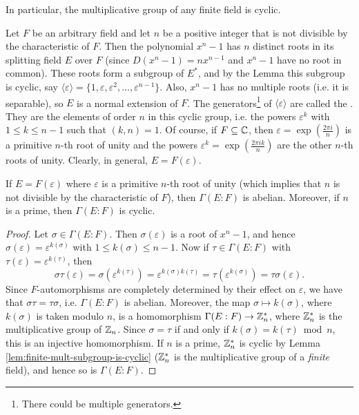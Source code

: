 In particular, the multiplicative group of any finite field is cyclic.

Let $F$ be an arbitrary field and let $n$ be a positive integer that is not divisible by the characteristic of $F$. Then the polynomial $x^n - 1$ has $n$ distinct roots in its splitting field $E$ over $F$ (since $D(x^n - 1) = nx^{n - 1}$ and $x^n - 1$ have no root in common). These roots form a subgroup of $E^*$, and by the Lemma this subgroup is cyclic, say $\langle \varepsilon \rangle = \{1, \varepsilon, \varepsilon^2, \dots, \varepsilon^{n - 1}\}$. Also, $x^n - 1$ has no multiple roots (i.e. it is separable), so $E$ is a normal extension of $F$. The generators\footnote{There could be multiple generators.} of $\langle \varepsilon \rangle$ are called the . They are the elements of order $n$ in this cyclic group, i.e. the powers $\varepsilon^k$ with $1 \leq k \leq n - 1$ such that $(k, n) = 1$. Of course, if $F \subseteq \mathbb{C}$, then $\varepsilon = \exp\left(\frac{2\pi i}{n}\right)$ is a primitive $n$-th root of unity and the powers $\varepsilon^k = \exp\left(\frac{2\pi ik}{n}\right)$ are the other $n$-th roots of unity. Clearly, in general, $E = F(\varepsilon)$.

\begin{theorem}\label{thm:20}
	If $E = F(\varepsilon)$ where $\varepsilon$ is a primitive $n$-th root of unity (which implies that $n$ is not divisible by the characteristic of $F$), then $\Gamma(E : F)$ is abelian. Moreover, if $n$ is a prime, then $\Gamma(E : F)$ is cyclic.
	\begin{proof}
		Let $\sigma \in \Gamma(E : F)$. Then $\sigma(\varepsilon)$ is a root of $x^n - 1$, and hence $\sigma(\varepsilon) = \varepsilon^{k(\sigma)}$ with $1 \leq k(\sigma) \leq n - 1$. Now if $\tau \in \Gamma(E : F)$ with $\tau(\varepsilon) = \varepsilon^{k(\tau)}$, then
		\[
			\sigma\tau(\varepsilon) = \sigma(\varepsilon^{k(\tau)}) = \varepsilon^{k(\sigma) k(\tau)} = \tau(\varepsilon^{k(\sigma)}) = \tau\sigma(\varepsilon).
		\]
		Since $F$-automorphisms are completely determined by their effect on $\varepsilon$, we have that $\sigma\tau = \tau\sigma$, i.e. $\Gamma(E : F)$ is abelian. Moreover, the map $\sigma \mapsto k(\sigma)$, where $k(\sigma)$ is taken modulo $n$, is a homomorphism $\Gamma(E : F) \to \mathbb{Z}_n^*$, where $\mathbb{Z}_n^*$ is the multiplicative group of $\mathbb{Z}_n$. Since $\sigma = \tau$ if and only if $k(\sigma) = k(\tau) \bmod n$, this is an injective homomorphism. If $n$ is a prime, $\mathbb{Z}_n^*$ is cyclic by Lemma \ref{lem:finite-mult-subgroup-is-cyclic} ($\mathbb{Z}_n^*$ is the multiplicative group of a \emph{finite} field), and hence so is $\Gamma(E : F)$.
	\end{proof}
\end{theorem}

